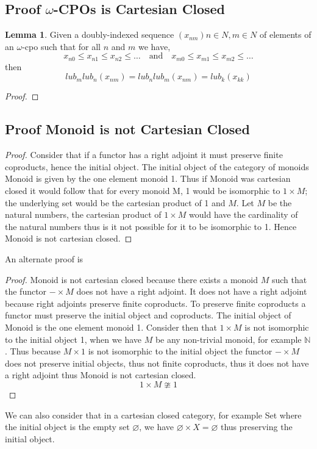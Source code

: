 \documentclass{article}
\theoremstyle{definition}
\newtheorem{lemma}{Lemma}[section]
\newcommand{\N}{\mathbb{N}}
\begin{document}
\subsection{Proof $\omega$-CPOs is Cartesian Closed}

\begin{lemma}
    Given a doubly-indexed sequence
    $(x_{nm})n\in N,m\in N$
    of elements of an $\omega$-cpo such that for all $n$ and $m$ we have,
    $$x_{n0} \leq x_{n1} \leq x_{n2} \leq \dots\quad\textrm{and}\quad
    x_{m0} \leq x_{m1} \leq x_{m2} \leq \dots$$
    then
    $$lub_mlub_n(x_{nm}) = lub_nlub_m(x_{nm}) = lub_k(x_{kk})$$
\end{lemma}


\begin{proof}

\end{proof}

\subsection{Proof Monoid is not Cartesian Closed}
\begin{proof}
    Consider that if a functor has a right adjoint it must preserve finite coproducts,
    hence the initial object.
    The initial object of the category of monoids Monoid is given by the one element monoid 1.
    Thus if Monoid was cartesian closed it would follow that for every monoid M,
    1 would be isomorphic to $1 \times M$;
    the underlying set would be the cartesian product of 1 and $M$.
    Let $M$ be the natural numbers,
    the cartesian product of $1 \times M$ would have the cardinality of the natural numbers
    thus is it not possible for it to be isomorphic to 1.
    Hence Monoid is not cartesian closed.
\end{proof}
An alternate proof is
\begin{proof}
    Monoid is not cartesian closed because there exists a monoid $M$ such that
    the functor $- \times M$ does not have a right adjoint.
    It does not have a right adjoint because right adjoints preserve finite coproducts.
    To preserve finite coproducts a functor must preserve the initial object and coproducts.
    The initial object of Monoid is the one element monoid 1.
    Consider then that $1 \times M$ is not isomorphic to the initial object 1,
    when we have $M$ be any non-trivial monoid, for example $\N$.
    Thus because $M \times 1$ is not isomorphic to the initial object
    the functor $- \times M$ does not preserve initial objects,
    thus not finite coproducts,
    thus it does not have a right adjoint
    thus Monoid is not cartesian closed.
    $$1 \times M \ncong 1$$
\end{proof}
We can also consider that in a cartesian closed category,
for example Set where the initial object is the empty set $\varnothing$,
we have $\varnothing \times X = \varnothing$ thus preserving the initial object.
\end{document}
